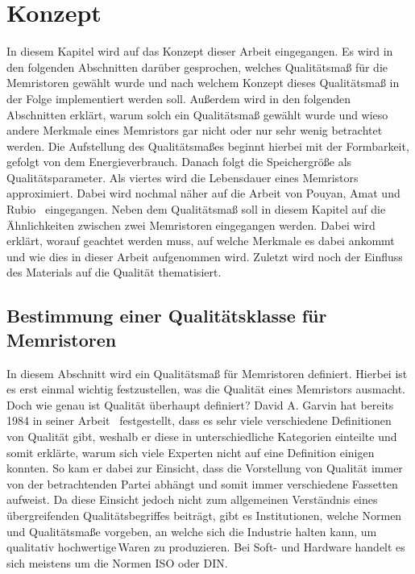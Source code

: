 

\chapter{Konzept}
\label{sec:Chapter3}

In diesem Kapitel wird auf das Konzept dieser Arbeit eingegangen. Es wird in den folgenden Abschnitten darüber gesprochen, welches Qualitätsmaß für die Memristoren gewählt wurde und nach welchem Konzept dieses Qualitätsmaß in der Folge implementiert werden soll. Außerdem wird in den folgenden Abschnitten erklärt, warum solch ein Qualitätsmaß gewählt wurde und wieso andere Merkmale eines Memristors gar nicht oder nur sehr wenig betrachtet werden. Die Aufstellung des Qualitätsmaßes beginnt hierbei mit der Formbarkeit, gefolgt von dem Energieverbrauch. Danach folgt die Speichergröße als Qualitätsparameter. Als viertes wird die Lebensdauer eines Memristors approximiert. Dabei wird nochmal näher auf die Arbeit von Pouyan, Amat und Rubio~\cite{stat_lifetime} eingegangen. Neben dem Qualitätsmaß soll in diesem Kapitel auf die Ähnlichkeiten zwischen zwei Memristoren eingegangen werden. Dabei wird erklärt, worauf geachtet werden muss, auf welche Merkmale es dabei ankommt und wie dies in dieser Arbeit aufgenommen wird. Zuletzt wird noch der Einfluss des Materials auf die Qualität thematisiert.

\section{Bestimmung einer Qualitätsklasse für Memristoren}
  In diesem Abschnitt wird ein Qualitätsmaß für Memristoren definiert. Hierbei ist es erst einmal wichtig festzustellen, was die Qualität eines Memristors ausmacht. Doch wie genau ist Qualität überhaupt definiert? David A. Garvin hat bereits 1984 in seiner Arbeit~\cite{garvin_qual} festgestellt, dass es sehr viele verschiedene Definitionen von Qualität gibt, weshalb er diese in unterschiedliche Kategorien einteilte und somit erklärte, warum sich viele Experten nicht auf eine Definition einigen konnten. So kam er dabei zur Einsicht, dass die Vorstellung von Qualität immer von der betrachtenden Partei abhängt und somit immer verschiedene Fassetten aufweist. Da diese Einsicht jedoch nicht zum allgemeinen Verständnis eines übergreifenden Qualitätsbegriffes beiträgt, gibt es Institutionen, welche Normen und Qualitätsmaße vorgeben, an welche sich die Industrie halten kann, um \glqq qualitativ hochwertige\grqq\,Waren zu produzieren. Bei Soft- und Hardware handelt es sich meistens um die Normen ISO oder DIN.

